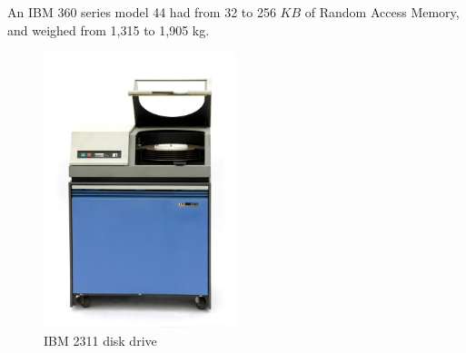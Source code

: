 \documentclass{beamer}
\begin{document}
\begin{frame}
\begin{columns}
\begin{column}{0.5\textwidth}
            \begin{block}{}
                An IBM 360 series model 44 had from 32 to 256 \(KB\) of Random Access Memory, and weighed from 1,315 to 1,905 kg.
                \begin{figure}
                    \centering
                    \includegraphics[width=0.5\textwidth,height=\textheight,keepaspectratio]{resources/made/ibmdisk_2311.png}
                    \caption[]{IBM 2311 disk drive}
                \end{figure}
            \end{block}
        \end{column}
    \end{columns}

    \framebreak


\end{frame}
\end{document}
